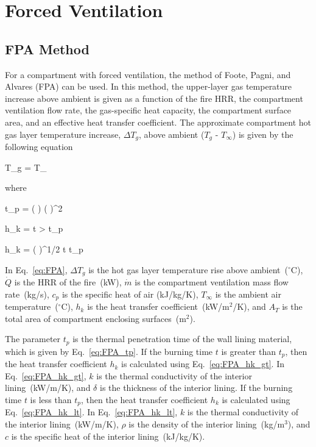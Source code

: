 \clearpage


\section{Forced Ventilation}

\subsection{FPA Method}

For a compartment with forced ventilation, the method of Foote, Pagni, and Alvares (FPA) can be used. In this method, the upper-layer gas temperature increase above ambient is given as a function of the fire HRR, the compartment ventilation flow rate, the gas-specific heat capacity, the compartment surface area, and an effective heat transfer coefficient. The approximate compartment hot gas layer temperature increase, $\Delta T_g$, above ambient ($T_g$ - $T_\infty$) is given by the following equation

\be
\Delta T_g =  T_\infty
\label{eq:FPA}
\ee

\noindent where

\be
t_p = \left(  \right) \left(  \right)^2
\label{eq:FPA_tp}
\ee

\be
h_k =   t > t_p
\label{eq:FPA_hk_gt}
\ee

\be
h_k = \left(  \right)^{1/2}  t \le t_p
\label{eq:FPA_hk_lt}
\ee

In Eq.~\ref{eq:FPA}, $\Delta T_g$ is the hot gas layer temperature rise above ambient~($^\circ$C), $\dot Q$ is the HRR of the fire~(kW), $\dot m$ is the compartment ventilation mass flow rate~(kg/s), $c_p$ is the specific heat of air (kJ/kg/K), $T_\infty$ is the ambient air temperature~($^\circ$C), $h_k$ is the heat transfer coefficient~(kW/m$^2$/K), and $A_T$ is the total area of compartment enclosing surfaces~(m$^2$).

The parameter $t_p$ is the thermal penetration time of the wall lining material, which is given by Eq.~\ref{eq:FPA_tp}. If the burning time $t$ is greater than $t_p$, then the heat transfer coefficient $h_k$ is calculated using Eq.~\ref{eq:FPA_hk_gt}. In Eq.~\ref{eq:FPA_hk_gt}, $k$ is the thermal conductivity of the interior lining~(kW/m/K), and $\delta$ is the thickness of the interior lining. If the burning time $t$ is less than $t_p$, then the heat transfer coefficient $h_k$ is calculated using Eq.~\ref{eq:FPA_hk_lt}. In Eq.~\ref{eq:FPA_hk_lt}, $k$ is the thermal conductivity of the interior lining~(kW/m/K), $\rho$ is the density of the interior lining~(kg/m$^3$), and $c$ is the specific heat of the interior lining~(kJ/kg/K).

